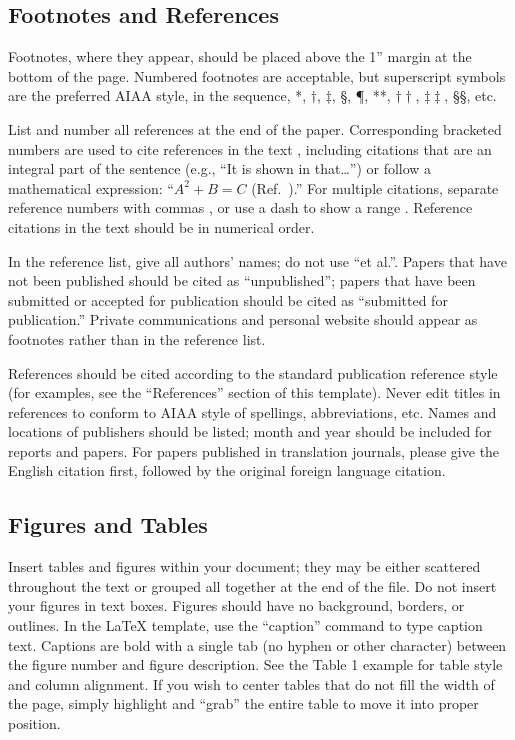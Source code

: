 \subsection{Footnotes and References}
Footnotes, where they appear, should be placed above the 1'' margin at the bottom of the page. Numbered footnotes are acceptable, but superscript symbols are the preferred AIAA style, in the sequence, *, $\dag$, $\ddag$, \S, \P, **, $\dag\dag$, $\ddag\ddag$, \S\S, etc.

List and number all references at the end of the paper. Corresponding bracketed numbers are used to cite references in the text \cite{vatistas1986reverse}, including citations that are an integral part of the sentence (e.g., ``It is shown in \cite{dornheim1996planetary} that\ldots '') or follow a mathematical expression: ``$A^{2} + B = C$ (Ref.~\cite{terster1997nasa}).'' For multiple citations, separate reference numbers with commas \cite{peyret2012computational,oates1997aerothermodynamics}, or use a dash to show a range \cite{volpe1994techniques,thompsonspacecraft,chi1993fluid,brandis2016nonequi}. Reference citations in the text should be in numerical order. 

In the reference list, give all authors' names; do not use ``et al.''. Papers that have not been published should be cited as ``unpublished''; papers that have been submitted or accepted for publication should be cited as ``submitted for publication.'' Private communications and personal website should appear as footnotes rather than in the reference list.

References should be cited according to the standard publication reference style (for examples, see the ``References'' section of this template). Never edit titles in references to conform to AIAA style of spellings, abbreviations, etc. Names and locations of publishers should be listed; month and year should be included for reports and papers. For papers published in translation journals, please give the English citation first, followed by the original foreign language citation.

\subsection{Figures and Tables}
Insert tables and figures within your document; they may be either scattered throughout the text or grouped all together at the end of the file. Do not insert your figures in text boxes. Figures should have no background, borders, or outlines. In the \LaTeX{} template, use the ``caption'' command to type caption text. Captions are bold with a single tab (no hyphen or other character) between the figure number and figure description. See the Table 1 example for table style and column alignment. If you wish to center tables that do not fill the width of the page, simply highlight and “grab” the entire table to move it into proper position.


